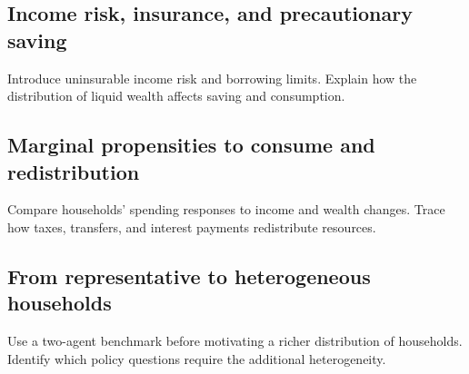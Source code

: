 \label{sec:heterogeneity}

\subsection{Income risk, insurance, and precautionary saving}
Introduce uninsurable income risk and borrowing limits. Explain how the
distribution of liquid wealth affects saving and consumption.

\subsection{Marginal propensities to consume and redistribution}
Compare households' spending responses to income and wealth changes.
Trace how taxes, transfers, and interest payments redistribute resources.

\subsection{From representative to heterogeneous households}
Use a two-agent benchmark before motivating a richer distribution of households.
Identify which policy questions require the additional heterogeneity.
